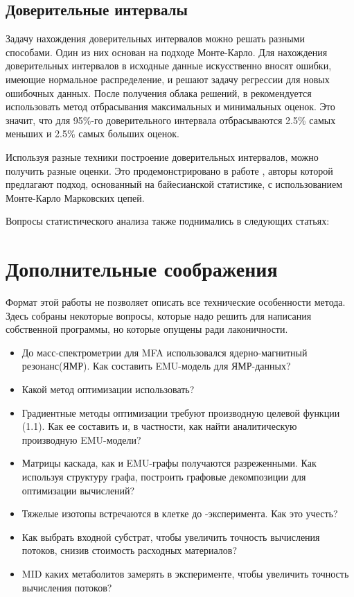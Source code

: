 \documentclass[14pt, a4paper]{extreport}
\begin{document}
\subsection{Доверительные интервалы}
Задачу нахождения доверительных интервалов можно решать разными способами. Один из них основан на подходе Монте-Карло. Для нахождения доверительных интервалов в исходные данные искусственно вносят ошибки, имеющие нормальное распределение, и решают задачу регрессии для новых ошибочных данных. После получения облака решений, в \cite{OpenFlux2} рекомендуется использовать метод отбрасывания максимальных и минимальных оценок. Это значит, что для 95\%-го доверительного интервала отбрасываются 2.5\% самых меньших и 2.5\% самых больших оценок.

Используя разные техники построение доверительных интервалов, можно получить разные оценки. Это продемонстрировано в работе \cite{bayesian}, авторы которой предлагают подход, основанный на байесианской статистике, с использованием Монте-Карло Марковских цепей.

Вопросы статистического анализа также поднимались в следующих статьях: \cite{Wiechert_1999_3, Wiechert_1999_4, ci_antoniewicz, bayesian, bayesian_2, bayesian_3}

\clearpage
\section{Дополнительные соображения}
Формат этой работы не позволяет описать все технические особенности метода. Здесь собраны некоторые вопросы, которые надо решить для написания собственной программы, но которые опущены ради лаконичности.
\begin{itemize}
	\item До масс-спектрометрии для MFA использовался ядерно-магнитный резонанс(ЯМР). Как составить EMU-модель для ЯМР-данных?\cite{EMU_2007}
	\item Какой метод оптимизации использовать?\cite{adjoint_approach, protocol, optimization_in_mfa} \cite[препринт]{2019_gradient}
	\item Градиентные методы оптимизации требуют производную целевой функции (1.1). Как ее составить и, в частности, как найти аналитическую производную EMU-модели? \cite{EMU_2007, protocol}
	\item Матрицы каскада, как и EMU-графы получаются разреженными. Как используя структуру графа, построить графовые декомпозиции для оптимизации вычислений? \cite{topology, emu_topology}
	\item Тяжелые изотопы встречаются в клетке до -эксперимента. Как это учесть?\cite{protocol}
	\item Как выбрать входной субстрат, чтобы увеличить точность вычисления потоков, снизив стоимость расходных материалов? \cite{planning_optimal, planning_optimal_2, planning_optimal_3, planning_optimal_4} 
	\item MID каких метаболитов замерять в эксперименте, чтобы увеличить точность вычисления потоков? \cite{optimal_measurements}
\end{itemize}
\end{document}
